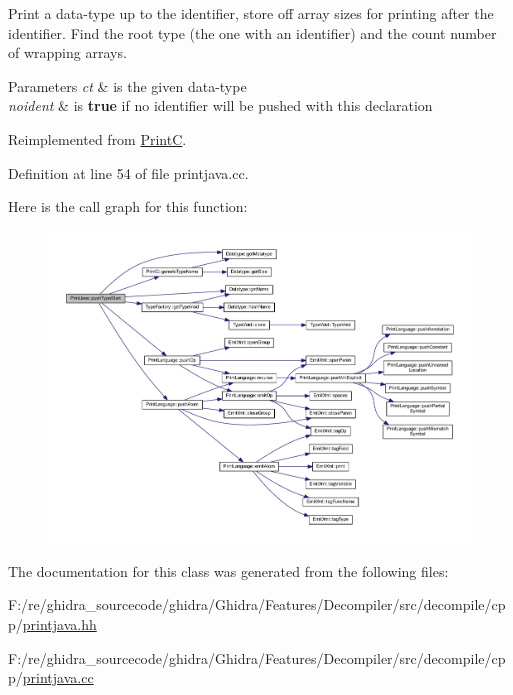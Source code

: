 Print a data-\/type up to the identifier, store off array sizes for printing after the identifier. Find the root type (the one with an identifier) and the count number of wrapping arrays. 
\begin{DoxyParams}{Parameters}
{\em ct} & is the given data-\/type \\
\hline
{\em noident} & is {\bfseries{true}} if no identifier will be pushed with this declaration \\
\hline
\end{DoxyParams}


Reimplemented from \mbox{\hyperlink{class_print_c_a0b96904bf7b1ecfb6b254c51707ae21a}{PrintC}}.



Definition at line 54 of file printjava.\+cc.

Here is the call graph for this function\+:
\nopagebreak
\begin{figure}[H]
\begin{center}
\leavevmode
\includegraphics[width=350pt]{class_print_java_af82e5ca143891ea052778b1ed234d3e0_cgraph}
\end{center}
\end{figure}


The documentation for this class was generated from the following files\+:\begin{DoxyCompactItemize}
\item 
F\+:/re/ghidra\+\_\+sourcecode/ghidra/\+Ghidra/\+Features/\+Decompiler/src/decompile/cpp/\mbox{\hyperlink{printjava_8hh}{printjava.\+hh}}\item 
F\+:/re/ghidra\+\_\+sourcecode/ghidra/\+Ghidra/\+Features/\+Decompiler/src/decompile/cpp/\mbox{\hyperlink{printjava_8cc}{printjava.\+cc}}\end{DoxyCompactItemize}
